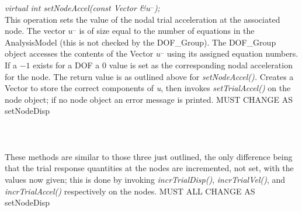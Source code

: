 {\em virtual int setNodeAccel(const Vector \&$u^{..}$);}\\
This operation sets the value of the nodal trial acceleration at the
associated node. The vector {\em $u^{..}$} is of size equal to the number of
equations in the AnalysisModel (this is not checked by the DOF\_Group).
The DOF\_Group object accesses the contents of the Vector {\em $u^{..}$} using
its assigned equation numbers. If a $-1$ exists for a DOF a $0$ value
is set as the corresponding nodal acceleration for the node. The return
value is as outlined above for {\em setNodeAccel().} Creates a Vector
to store the correct components of {\em u}, then invokes {\em setTrialAccel()}
on the node object; if no node object an error message is printed. 
MUST CHANGE AS setNodeDisp \\



 \\
\\
\\
These methods are similar to those three just outlined, the only
difference being that the trial response quantities at the nodes are
incremented, not set, with the values now given; this is done by
invoking {\em incrTrialDisp()}, {\em incrTrialVel()}, and {\em 
incrTrialAccel()} respectively on the nodes. MUST ALL CHANGE AS
setNodeDisp \\ 






